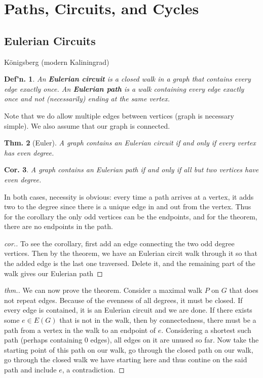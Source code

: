\documentclass[12pt, a4paper]{book}
\newtheorem{theorem}{Thm.}[section]
\newtheorem{definition}[theorem]{Def'n.}
\newtheorem{corollary}[theorem]{Cor.}
\theoremstyle{nonumberplain}
\newtheorem{proof}{Proof}
\begin{document}
\section{Paths, Circuits, and Cycles}
\subsection{Eulerian Circuits}
K\"onigsberg (modern Kaliningrad)
\begin{definition}
    An \textbf{Eulerian circuit} is a closed walk in a graph that contains every edge exactly once.
    An \textbf{Eulerian path} is a walk containing every edge exactly once and not (necessarily) ending at the same vertex.
\end{definition}
Note that we do allow multiple edges between vertices (graph is necessary simple).
We also assume that our graph is connected.
\begin{theorem}[Euler]
    A graph contains an Eulerian circuit if and only if every vertex has even degree.
\end{theorem}
\begin{corollary}
    A graph contains an Eulerian path if and only if all but two vertices have even degree.
\end{corollary}
In both cases, necessity is obvious: every time a path arrives at a vertex, it adds two to the degree since there is a unique edge in and out from the vertex.
Thus for the corollary the only odd vertices can be the endpoints, and for the theorem, there are no endpoints in the path.
\begin{proof}[cor.]
    To see the corollary, first add an edge connecting the two odd degree vertices.
    Then by the theorem, we have an Eulerian circit walk through it so that the added edge is the last one traversed.
    Delete it, and the remaining part of the walk gives our Eulerian path
\end{proof}
\begin{proof}[thm.]
    We can now prove the theorem.
    Consider a maximal walk $P$ on $G$ that does not repeat edges.
    Because of the evenness of all degrees, it must be closed.
    If every edge is contained, it is an Eulerian circuit and we are done.
    If there exists some $e\in E(G)$ that is not in the walk, then by connectedness, there must be a path from a vertex in the walk to an endpoint of $e$.
    Considering a shortest such path (perhaps containing 0 edges), all edges on it are unused so far.
    Now take the starting point of this path on our walk, go through the closed path on our walk, go through the closed walk we have starting here and thus contine on the said path and include $e$, a contradiction.
\end{proof}
\end{document}
